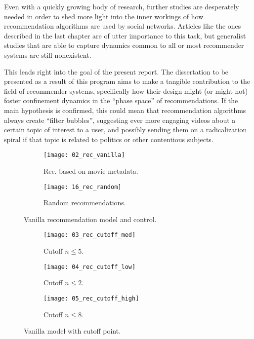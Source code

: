 Even with a quickly growing body of research, further studies are desperately
needed in order to shed more light into the inner workings of how recommendation
algorithms are used by social networks. Articles like the ones described in the
last chapter are of utter importance to this task, but generalist studies that
are able to capture dynamics common to all or most recommender systems are still
nonexistent.

This leads right into the goal of the present report. The dissertation to be
presented as a result of this program aims to make a tangible contribution to
the field of recommender systems, specifically how their design might (or might
not) foster confinement dynamics in the ``phase space'' of recommendations. If
the main hypothesis is confirmed, this could mean that recommendation algorithms
always create ``filter bubbles'', suggesting ever more engaging videos about a
certain topic of interest to a user, and possibly sending them on a
radicalization spiral if that topic is related to politics or other contentious
subjects.

\begin{figure}
  \centering
  \begin{subfigure}{0.45\textwidth}
    \centering
    \texttt{[image: 02\_rec\_vanilla]}
    \caption{Rec. based on movie metadata.\label{fig:fig1:a}}
  \end{subfigure}
  \begin{subfigure}{0.45\textwidth}
    \centering
    \texttt{[image: 16\_rec\_random]}
    \caption{Random recommendations.\label{fig:fig1:b}}
  \end{subfigure}
  \caption{Vanilla recommendation model and control.\label{fig:fig1}}
\end{figure}

\begin{figure}
  \centering
  \begin{subfigure}{0.3\textwidth}
    \centering
    \texttt{[image: 03\_rec\_cutoff\_med]}
    \caption{Cutoff $n \leqslant 5$.\label{fig:fig2:a}}
  \end{subfigure}
  \begin{subfigure}{0.3\textwidth}
    \centering
    \texttt{[image: 04\_rec\_cutoff\_low]}
    \caption{Cutoff $n \leqslant 2$.\label{fig:fig2:b}}
  \end{subfigure}
  \begin{subfigure}{0.3\textwidth}
    \centering
    \texttt{[image: 05\_rec\_cutoff\_high]}
    \caption{Cutoff $n \leqslant 8$.\label{fig:fig2:c}}
  \end{subfigure}
  \caption{Vanilla model with cutoff point.\label{fig:fig2}}
\end{figure}

